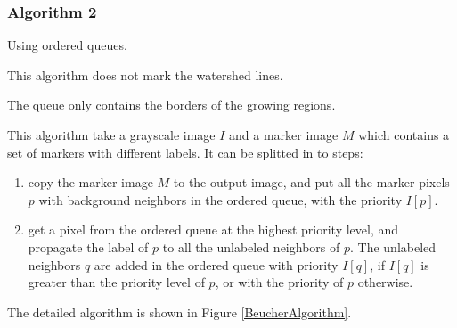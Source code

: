 \documentclass{InsightArticle}
\begin{document}
\subsubsection{Algorithm 2}
Using ordered queues.

This algorithm does not mark the watershed lines.

The queue only contains the borders of the growing regions.

This algorithm take a grayscale image $I$ and a marker image $M$
which contains a set of markers with different labels. It can be
splitted in to steps:
\begin{enumerate}
  \item copy the marker image $M$ to the output image, and put
all the marker pixels $p$ with background neighbors in the
ordered queue, with the priority $I[p]$.
  \item get a pixel from the ordered queue at the highest
priority level, and propagate the label of $p$ to all the unlabeled
neighbors of $p$. The unlabeled neighbors $q$ are added in the
ordered queue with priority $I[q]$, if $I[q]$ is greater than
the priority level of $p$, or with the priority of $p$ otherwise.
\end{enumerate}

The detailed algorithm is shown in Figure \ref{BeucherAlgorithm}.
\end{document}
